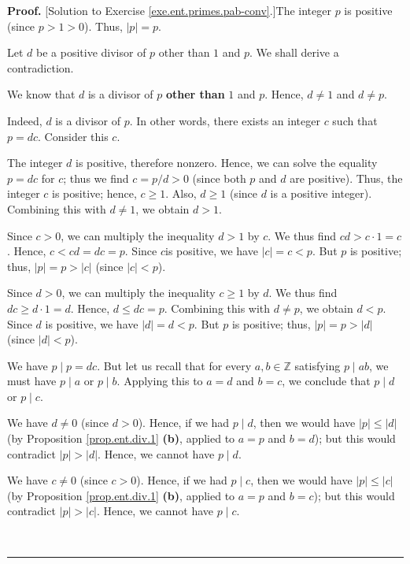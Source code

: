 \documentclass[numbers=enddot,12pt,final,onecolumn,notitlepage]{scrartcl}%
\numberwithin{exer}{subsection}
\theoremstyle{definition}
\newenvironment{fineprint}{\begin{small}}{\end{small}}
\newenvironment{proof}[1][Proof]{\noindent\textbf{#1.} }{\ \rule{0.5em}{0.5em}}
\begin{document}
\begin{fineprint}
\begin{proof}
[Solution to Exercise \ref{exe.ent.primes.pab-conv}.]The integer $p$ is
positive (since $p>1>0$). Thus, $\left\vert p\right\vert =p$.

Let $d$ be a positive divisor of $p$ other than $1$ and $p$. We shall derive a contradiction.

We know that $d$ is a divisor of $p$ \textbf{other than} $1$ and $p$. Hence,
$d\neq1$ and $d\neq p$.

Indeed, $d$ is a divisor of $p$. In other words, there exists an integer $c$
such that $p=dc$. Consider this $c$.

The integer $d$ is positive, therefore nonzero. Hence, we can solve the
equality $p=dc$ for $c$; thus we find $c=p/d>0$ (since both $p$ and $d$ are
positive). Thus, the integer $c$ is positive; hence, $c\geq1$. Also, $d\geq1$
(since $d$ is a positive integer). Combining this with $d\neq1$, we obtain
$d>1$.

Since $c>0$, we can multiply the inequality $d>1$ by $c$. We thus find
$cd>c\cdot1=c$. Hence, $c<cd=dc=p$. Since $c$is positive, we have $\left\vert
c\right\vert =c<p$. But $p$ is positive; thus, $\left\vert p\right\vert
=p>\left\vert c\right\vert $ (since $\left\vert c\right\vert <p$).

Since $d>0$, we can multiply the inequality $c\geq1$ by $d$. We thus find
$dc\geq d\cdot1=d$. Hence, $d\leq dc=p$. Combining this with $d\neq p$, we
obtain $d<p$. Since $d$ is positive, we have $\left\vert d\right\vert =d<p$.
But $p$ is positive; thus, $\left\vert p\right\vert =p>\left\vert d\right\vert
$ (since $\left\vert d\right\vert <p$).

We have $p\mid p=dc$. But let us recall that for every $a,b\in\mathbb{Z}$
satisfying $p\mid ab$, we must have $p\mid a$ or $p\mid b$. Applying this to
$a=d$ and $b=c$, we conclude that $p\mid d$ or $p\mid c$.

We have $d\neq0$ (since $d>0$). Hence, if we had $p\mid d$, then we would have
$\left\vert p\right\vert \leq\left\vert d\right\vert $ (by Proposition
\ref{prop.ent.div.1} \textbf{(b)}, applied to $a=p$ and $b=d$); but this would
contradict $\left\vert p\right\vert >\left\vert d\right\vert $. Hence, we
cannot have $p\mid d$.

We have $c\neq0$ (since $c>0$). Hence, if we had $p\mid c$, then we would have
$\left\vert p\right\vert \leq\left\vert c\right\vert $ (by Proposition
\ref{prop.ent.div.1} \textbf{(b)}, applied to $a=p$ and $b=c$); but this would
contradict $\left\vert p\right\vert >\left\vert c\right\vert $. Hence, we
cannot have $p\mid c$.


\end{proof}
\end{fineprint}
\end{document}
